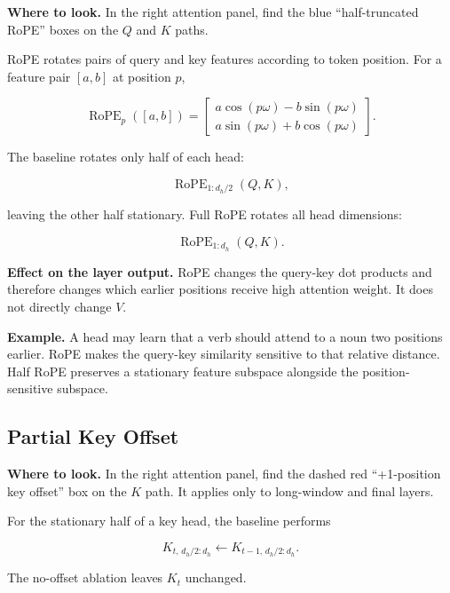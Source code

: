 \documentclass[11pt,a4paper]{article}
\begin{document}
\textbf{Where to look.} In the right attention panel, find the blue
``half-truncated RoPE'' boxes on the $Q$ and $K$ paths.

RoPE rotates pairs of query and key features according to token position. For a
feature pair $[a,b]$ at position $p$,

\begin{equation}
  \operatorname{RoPE}_p([a,b])=
  \begin{bmatrix}
    a\cos(p\omega)-b\sin(p\omega)\\
    a\sin(p\omega)+b\cos(p\omega)
  \end{bmatrix}.
\end{equation}

The baseline rotates only half of each head:

\begin{equation}
  \operatorname{RoPE}_{1:d_h/2}(Q,K),
\end{equation}

leaving the other half stationary. Full RoPE rotates all head dimensions:

\begin{equation}
  \operatorname{RoPE}_{1:d_h}(Q,K).
\end{equation}

\textbf{Effect on the layer output.} RoPE changes the query-key dot products and
therefore changes which earlier positions receive high attention weight. It does
not directly change $V$.

\textbf{Example.} A head may learn that a verb should attend to a noun two
positions earlier. RoPE makes the query-key similarity sensitive to that
relative distance. Half RoPE preserves a stationary feature subspace alongside
the position-sensitive subspace.

\subsection{Partial Key Offset}

\textbf{Where to look.} In the right attention panel, find the dashed red
``+1-position key offset'' box on the $K$ path. It applies only to long-window
and final layers.

For the stationary half of a key head, the baseline performs

\begin{equation}
  K_{t,\,d_h/2:d_h}
  \leftarrow K_{t-1,\,d_h/2:d_h}.
\end{equation}

The no-offset ablation leaves $K_t$ unchanged.
\end{document}
